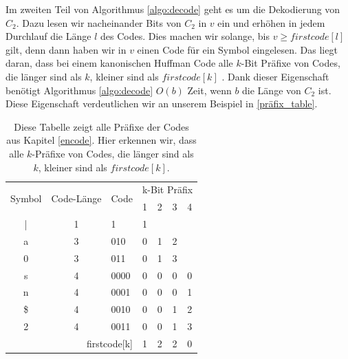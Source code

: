 \documentclass[a4paper,11pt]{scrartcl}%
\theoremstyle{change}
\theoremstyle{nonumberplain}
\theoremstyle{change}
\theoremstyle{nonumberplain}
\theoremstyle{change}
\theoremstyle{nonumberplain}
\begin{document}
Im zweiten Teil von Algorithmus \ref{algo:decode} geht es um die Dekodierung von $C_2$. Dazu lesen wir nacheinander Bits von $C_2$ in $v$ ein und erhöhen in jedem Durchlauf die Länge $l$ des Codes. Dies machen wir solange, bis $v \geq firstcode[l]$ gilt, denn dann haben wir in $v$ einen Code für ein Symbol eingelesen. Das liegt daran, dass bei einem kanonischen Huffman Code alle $k$-Bit Präfixe von Codes, die länger sind als $k$, kleiner sind als $firstcode[k]$ \cite[S. 338]{managingGigabytes}. Dank dieser Eigenschaft benötigt Algorithmus \ref{algo:decode} $O(b)$ Zeit, wenn $b$ die Länge von $C_2$ ist. Diese Eigenschaft verdeutlichen wir an unserem Beispiel in \autoref{präfix_table}.

\begin{table}[h]
\centering
\label{my-label}
\begin{tabular}{|c|c|l|l|l|l|l|}
\hline
\multicolumn{1}{|l|}{\multirow{2}{*}{Symbol}} & \multicolumn{1}{l|}{\multirow{2}{*}{Code-Länge}} & \multirow{2}{*}{Code} & \multicolumn{4}{l|}{k-Bit Präfix} \\ \cline{4-7} 
\multicolumn{1}{|l|}{}                        & \multicolumn{1}{l|}{}                            &                       & 1      & 2      & 3      & 4      \\ \hline
|                                             & 1                                                & 1                     & 1      &        &        &        \\ \hline
a                                             & 3                                                & 010                   & 0      & 1      & 2      &        \\ \hline
0                                             & 3                                                & 011                   & 0      & 1      & 3      &        \\ \hline
s                                             & 4                                                & 0000                  & 0      & 0      & 0      & 0      \\ \hline
n                                             & 4                                                & 0001                  & 0      & 0      & 0      & 1      \\ \hline
\$                                             & 4                                                & 0010                  & 0      & 0      & 1      & 2      \\ \hline
2                                             & 4                                                & 0011                  & 0      & 0      & 1      & 3      \\ \hline\hline
\multicolumn{3}{|r|}{firstcode{[}k{]}}                                                                                   & 1      & 2      & 2      & 0      \\ \hline
\end{tabular}
\caption{Diese Tabelle zeigt alle Präfixe der Codes aus Kapitel \ref{encode}. Hier erkennen wir, dass alle $k$-Präfixe von Codes, die länger sind als $k$, kleiner sind als $firstcode[k]$.}
\label{präfix_table}
\end{table}
\end{document}
